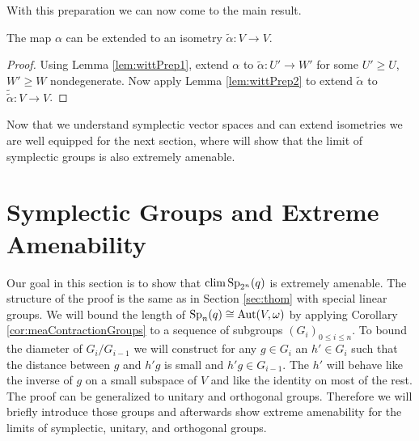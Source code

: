 With this preparation we can now come to the main result.
\begin{corollary}\label{lem:witt}
	The map $\alpha$ can be extended to an isometry $\tilde{\alpha}\colon V\to V$.
\end{corollary}
\begin{proof}
	Using Lemma \ref{lem:wittPrep1}, extend $\alpha$ to $\tilde{\alpha}\colon U'\to W'$ for some $U'\geq U$, $W'\geq W$ nondegenerate. Now apply Lemma \ref{lem:wittPrep2} to extend $\tilde{\alpha}$ to $\tilde{\tilde{\alpha}}\colon V\to V$.
\end{proof}
		
Now that we understand symplectic vector spaces and can extend isometries we are well equipped for the next section, where will show that the limit of symplectic groups is also extremely amenable.
		
		
\section{Symplectic Groups and Extreme Amenability}\label{sec:mySec}
		
		
Our goal in this section is to show that $\operatorname{clim} \operatorname{Sp}_{2^n}(q)$ is extremely amenable. The structure of the proof is the same as in Section \ref{sec:thom} with special linear groups. We will bound the length of $\operatorname{Sp}_n(q)\cong\operatorname{Aut}(V,\omega)$ by applying Corollary \ref{cor:meaContractionGroups} to a sequence of subgroups $(G_i)_{0\leq i\leq n}$. To bound the diameter of $G_i/G_{i-1}$ we will construct for any $g\in G_i$ an $h'\in G_i$ such that the distance between $g$ and $h'g$ is small and $h'g\in G_{i-1}$. The $h'$ will behave like the inverse of $g$ on a small subspace of $V$ and like the identity on most of the rest. The proof can be generalized to unitary and orthogonal groups. Therefore we will briefly introduce those groups and afterwards show extreme amenability for the limits of symplectic, unitary, and orthogonal groups.
		
